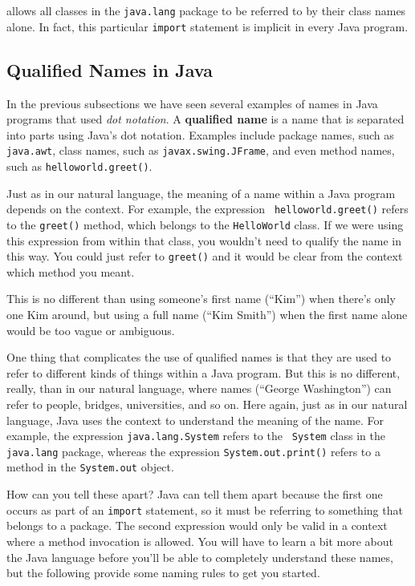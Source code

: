 \noindent allows all classes in the {\tt java.lang} package to
be referred to by their class names alone. In fact, this particular
{\tt import} statement is implicit in every Java program.

\subsection{Qualified Names in Java}
\label{subsec:qualifiednames}

\noindent In the previous subsections we have seen several
examples of names in Java programs that used {\it dot notation}.  A
{\bf qualified name} is a name that is separated into parts using
Java's dot notation. Examples include package names, such as {\tt
java.awt}, class names, such as {\tt javax.swing.JFrame}, and
even method names, such as {\tt helloworld.greet()}.

Just as in our natural language, the meaning of a name within a Java
program depends on the context.  For example, the expression {\tt
helloworld.greet()} refers to the {\tt greet()} method, which
belongs to the {\tt HelloWorld} class.  If we were using this
expression from within that class, you wouldn't need to qualify
the name in this way.  You could just refer to {\tt greet()} and it
would be clear from the context which method you meant.

This is no different than using someone's first name (``Kim'') when
there's only one Kim around, but using a full name (``Kim Smith'')
when the first name alone would be too vague or ambiguous.

One thing that complicates the use of qualified names is that they are
used to refer to different kinds of things within a Java program.  But
this is no different, really, than in our natural language, where
names (``George Washington'') can refer to people, bridges,
universities, and so on. Here again, just as in our natural language,
Java uses the context to understand the meaning of the name.  For
example, the expression {\tt java.lang.System} refers to the {\tt
System} class in the {\tt java.lang} package, whereas the expression
{\tt System.out.print()} refers to a method in the {\tt System.out}
object.

How can you tell these apart?  Java can tell them apart because the
first one occurs as part of an {\tt import} statement, so it must be
referring to something that belongs to a package.  The second expression
would only be valid in a context where a method invocation is allowed.
You will have to learn a bit more about the Java language before
you'll be able to completely understand these names, but the following
provide some naming rules to get you started.


